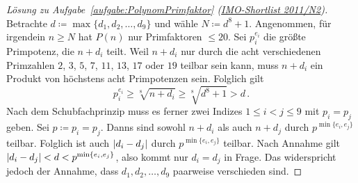 \begin{proof}[Lösung zu Aufgabe~\ref{aufgabe:PolynomPrimfaktor} \textmd{(\href{https://artofproblemsolving.com/community/c3962_2011_imo_shortlist}{IMO-Shortlist 2011/N2})}]
	Betrachte $d\coloneqq\max\{d_1,d_2,\dotsc,d_9\}$ und wähle $N\coloneqq d^8+1$. Angenommen, für irgendein $n\geqslant N$ hat $P(n)$ nur Primfaktoren $\leqslant 20$. Sei $p_i^{e_i}$ die größte Primpotenz, die $n+d_i$ teilt. Weil $n+d_i$ nur durch die acht verschiedenen Primzahlen $2$, $3$, $5$, $7$, $11$, $13$, $17$ oder $19$ teilbar sein kann, muss $n+d_i$ ein Produkt von höchstens acht Primpotenzen sein. Folglich gilt
	\begin{equation*}
		p_i^{e_i}\geqslant \sqrt[8]{n+d_i}\geqslant \sqrt[8]{d^8+1}>d\,.
	\end{equation*}
	Nach dem Schubfachprinzip muss es ferner zwei Indizes $1\leqslant i<j\leqslant 9$ mit $p_i=p_j$ geben. Sei $p\coloneqq p_i=p_j$. Danns sind sowohl $n+d_i$ als auch $n+d_j$ durch $p^{\min\{e_i,e_j\}}$ teilbar. Folglich ist auch $\lvert d_i-d_j\rvert$ durch $p^{\min\{e_i,e_j\}}$ teilbar. Nach Annahme gilt $\lvert d_i-d_j\rvert<d<p^{\min\{e_i,e_j\}}$, also kommt nur $d_i=d_j$ in Frage. Das widerspricht jedoch der Annahme, dass $d_1,d_2,\dotsc,d_9$ paarweise verschieden sind.
\end{proof}

